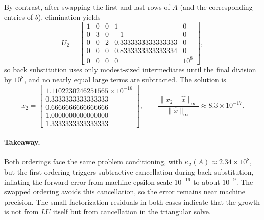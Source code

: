 \documentclass[11pt]{article}
\begin{document}
By contrast, after swapping the first and last rows of \(A\) (and the corresponding entries of \(b\)), elimination yields
\[
U_{2}=
\begin{bmatrix}
1&0&0&1&0\\
0&3&0&-1&0\\
0&0&2&0.3333333333333333&0\\
0&0&0&0.8333333333333334&0\\
0&0&0&0&10^{8}
\end{bmatrix},
\]
so back substitution uses only modest-sized intermediates until the final division by \(10^{8}\), and no nearly equal large terms are subtracted. The solution is
\[
x_{2}=
\begin{bmatrix}
1.1102230246251565\times 10^{-16}\\
0.3333333333333333\\
0.6666666666666666\\
1.0000000000000000\\
1.3333333333333333
\end{bmatrix},
\qquad
\frac{\lVert x_{2}-\hat x\rVert_{\infty}}{\lVert \hat x\rVert_{\infty}}\approx 8.3\times 10^{-17}.
\]

\paragraph{Takeaway.}
Both orderings face the same problem conditioning, with \(\kappa_{2}(A)\approx 2.34\times 10^{8}\), but the first ordering triggers subtractive cancellation during back substitution, inflating the forward error from machine-epsilon scale \(10^{-16}\) to about \(10^{-9}\). The swapped ordering avoids this cancellation, so the error remains near machine precision. The small factorization residuals in both cases indicate that the growth is not from \(LU\) itself but from cancellation in the triangular solve.
\end{document}
